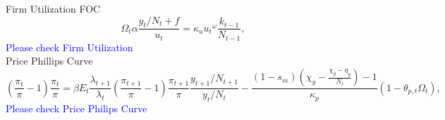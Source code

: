 \documentclass[10pt]{article}
\begin{document}
Firm Utilization FOC
\begin{equation}
    \Omega_{t}\alpha\frac{y_{t}/N_{t}+f}{u_{t}} = {\kappa_{u}}{u_{t}}^{\omega}\frac{k_{t-1}}{N_{t-1}},
\end{equation}
\textcolor{blue}{Please check Firm Utilization}\\
Price Phillips Curve
\begin{equation}
    \left(\frac{\pi_{t}}{\pi}-1 \right)\frac{\pi_{t}}{\pi} = \beta E_{t}\frac{\lambda_{t+1}}{\lambda_{t}}\left(\frac{\pi_{t+1}}{\pi}-1\right)\frac{\pi_{t+1}}{\pi}\frac{y_{t+1}/N_{t+1}}{y_{t}/N_{t}} - \frac{\left(1-s_{m}\right)\left(\chi_{y} - \frac{\chi_{y}-\eta_{y}}{N_{t}}\right)-1}{\kappa_{p}}\left(1-\theta_{p,t}\Omega_{t}\right),
\end{equation}
\textcolor{blue}{Please check Price Philips Curve}\\
\end{document}
